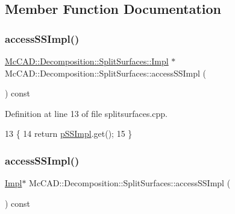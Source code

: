 \subsection{Member Function Documentation}
\mbox{\label{classMcCAD_1_1Decomposition_1_1SplitSurfaces_a3b6480dcdde196aff297ded78b5391fc}} 
\subsubsection{\texorpdfstring{access\+S\+S\+Impl()}{accessSSImpl()}\hspace{0.1cm}{\footnotesize\ttfamily [1/2]}}
{\footnotesize\ttfamily \hyperlink{classMcCAD_1_1Decomposition_1_1SplitSurfaces_1_1Impl}{Mc\+C\+A\+D\+::\+Decomposition\+::\+Split\+Surfaces\+::\+Impl} $\ast$ Mc\+C\+A\+D\+::\+Decomposition\+::\+Split\+Surfaces\+::access\+S\+S\+Impl (\begin{DoxyParamCaption}{ }\end{DoxyParamCaption}) const}



Definition at line 13 of file splitsurfaces.\+cpp.


\begin{DoxyCode}
13                                                    \{
14   \textcolor{keywordflow}{return} \hyperlink{classMcCAD_1_1Decomposition_1_1SplitSurfaces_a0cc9726e3748cbdcaa63533baca3959d}{pSSImpl}.get();
15 \}
\end{DoxyCode}
\mbox{\label{classMcCAD_1_1Decomposition_1_1SplitSurfaces_a2aaf6c8bee23bf628bc1c57da775a11e}} 
\subsubsection{\texorpdfstring{access\+S\+S\+Impl()}{accessSSImpl()}\hspace{0.1cm}{\footnotesize\ttfamily [2/2]}}
{\footnotesize\ttfamily \hyperlink{classMcCAD_1_1Decomposition_1_1SplitSurfaces_1_1Impl}{Impl}$\ast$ Mc\+C\+A\+D\+::\+Decomposition\+::\+Split\+Surfaces\+::access\+S\+S\+Impl (\begin{DoxyParamCaption}{ }\end{DoxyParamCaption}) const}




